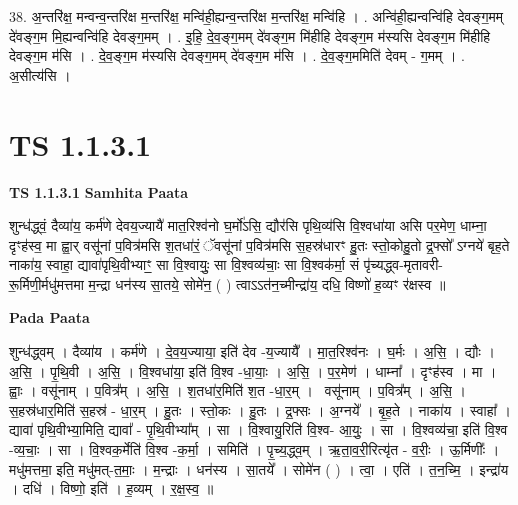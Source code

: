 \documentclass[17pt]{extarticle}
\begin{document}
38. अ॒न्तरि॑क्ष॒ मन्वन्व॒न्तरि॑क्ष म॒न्तरि॑क्ष॒ मन्वि॑ही॒ह्यन्व॒न्तरि॑क्ष म॒न्तरि॑क्ष॒ मन्वि॑हि । . अन्वि॑ही॒ह्यन्वन्वि॑हि देवङ्ग॒मम् दे॑वङ्ग॒म मि॒ह्यन्वन्वि॑हि देवङ्ग॒मम् । . इ॒हि॒ दे॒व॒ङ्ग॒मम् दे॑वङ्ग॒म मि॑हीहि देवङ्ग॒म म॑स्यसि देवङ्ग॒म मि॑हीहि देवङ्ग॒म म॑सि । . दे॒व॒ङ्ग॒म म॑स्यसि देवङ्ग॒मम् दे॑वङ्ग॒म म॑सि । . दे॒व॒ङ्ग॒ममिति॑ देवम् - ग॒मम् । . अ॒सीत्य॑सि । \newline
\pagebreak
{}

\section{ TS 1.1.3.1 }

\textbf{TS 1.1.3.1 } \newline
\textbf{Samhita Paata} \newline

शुन्ध॑द्ध्वं॒ दैव्या॑य॒ कर्म॑णे देवय॒ज्यायै॑ मात॒रिश्व॑नो घ॒र्मो॑ऽसि॒ द्यौर॑सि पृथि॒व्य॑सि वि॒श्वधा॑या असि पर॒मेण॒ धाम्ना॒ दृꣳह॑स्व॒ मा ह्वा॒र् वसू॑नां प॒वित्र॑मसि श॒तधा॑रं॒ ॅवसू॑नां प॒वित्र॑मसि स॒हस्र॑धारꣳ हु॒तः स्तो॒कोहु॒तो द्र॒फ्सो᳚ ऽग्नये॑ बृह॒ते नाका॑य॒ स्वाहा॒ द्यावा॑पृथि॒वीभ्याꣳ॒॒ सा वि॒श्वायुः॒ सा वि॒श्वव्य॑चाः॒ सा वि॒श्वक॑र्मा॒ सं पृ॑च्यद्ध्व-मृतावरी-रू॒र्मिणी॒र्मधु॑मत्तमा म॒न्द्रा धन॑स्य सा॒तये॒ सोमे॑न॒ ( ) त्वाऽऽत॑न॒च्मीन्द्रा॑य॒ दधि॒ विष्णो॑ ह॒व्यꣳ र॑क्षस्व ॥ \newline

\textbf{Pada Paata} \newline

शुन्ध॑द्ध्वम् । दैव्या॑य । कर्म॑णे । दे॒व॒य॒ज्याया॒ इति॑ देव -य॒ज्यायै᳚ । मा॒त॒रिश्व॑नः । घ॒र्मः । अ॒सि॒ । द्यौः । अ॒सि॒ । पृ॒थि॒वी । अ॒सि॒ । वि॒श्वधा॑या॒ इति॑ वि॒श्व -धा॒याः॒ । अ॒सि॒ । प॒र॒मेण॑ । धाम्ना᳚ । दृꣳह॑स्व । मा । ह्वाः॒ । वसू॑नाम् । प॒वित्र᳚म् । अ॒सि॒ । श॒तधा॑र॒मिति॑ श॒त -धा॒र॒म् ।  वसू॑नाम् । प॒वित्र᳚म् । अ॒सि॒ । स॒हस्र॑धार॒मिति॑ स॒हस्र॑ - धा॒र॒म् । हु॒तः । स्तो॒कः । हु॒तः । द्र॒फ्सः । अ॒ग्नये᳚ । बृ॒ह॒ते । नाका॑य । स्वाहा᳚ । द्यावा॑ पृथि॒वीभ्या॒मिति॒ द्यावा᳚ - पृ॒थि॒वीभ्या᳚म् । सा । वि॒श्वायु॒रिति॑ वि॒श्व- आ॒युः॒ । सा । वि॒श्वव्य॑चा॒ इति॑ वि॒श्व -व्य॒चाः॒ । सा । वि॒श्वक॒र्मेति॑ वि॒श्व -क॒र्मा॒ । समिति॑ । पृ॒च्य॒द्ध्व॒म् । ऋ॒ता॒व॒री॒रित्यृ॑त - व॒रीः॒ । ऊ॒र्मिणीः᳚ । मधु॑मत्तमा॒ इति॒ मधु॑मत्-त॒माः॒ । म॒न्द्राः । धन॑स्य । सा॒तये᳚ । सोमे॑न ( ) । त्वा॒ । एति॑ । त॒न॒च्मि॒ । इन्द्रा॑य । दधि॑ । विष्णो॒ इति॑ । ह॒व्यम् । र॒क्ष॒स्व॒ ॥  \newline
\end{document}
